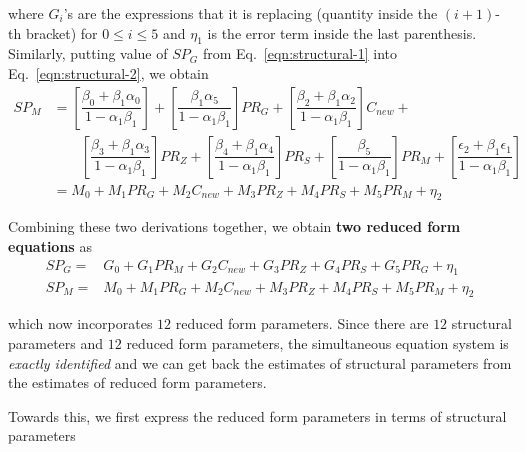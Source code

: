 \documentclass[11pt, a4paper]{article}
\begin{document}
\noindent where $G_i$'s are the expressions that it is replacing (quantity inside the $(i+1)$-th bracket) for $0 \leq i \leq 5$ and $\eta_{1}$ is the error term inside the last parenthesis. Similarly, putting value of $SP_G$ from Eq.~\eqref{eqn:structural-1} into Eq.~\eqref{eqn:structural-2}, we obtain
%
\begin{align*}
    SP_{M} & =  \left[\dfrac{\beta_{0}+\beta_{1}\alpha_{0}}{1-\alpha_{1}\beta_{1}}\right]+\left[\dfrac{\beta_{1}\alpha_{5}}{1-\alpha_{1}\beta_{1}}\right]PR_{G}+\left[\dfrac{\beta_{2}+\beta_{1}\alpha_{2}}{1-\alpha_{1}\beta_{1}}\right]C_{new}+\\
    & \qquad  \left[\dfrac{\beta_{3}+\beta_{1}\alpha_{3}}{1-\alpha_{1}\beta_{1}}\right]PR_{Z}+ \left[\dfrac{\beta_{4}+\beta_{1}\alpha_{4}}{1-\alpha_{1}\beta_{1}}\right]PR_{S}  +\left[\dfrac{\beta_{5}}{1-\alpha_{1}\beta_{1}}\right]PR_{M}+\left[\dfrac{\epsilon_{2}+\beta_{1}\epsilon_{1}}{1-\alpha_{1}\beta_{1}}\right] \\
     & = M_{0}+M_{1}PR_{G}+M_{2}C_{new}+M_{3}PR_{Z}+M_{4}PR_{S}+M_{5}PR_{M}+\eta_{2}
\end{align*}

Combining these two derivations together, we obtain \textbf{two reduced form equations} as
%
\begin{align}
    SP_{G} = & G_{0}+G_{1}PR_{M}+G_{2}C_{new}+G_{3}PR_{Z}+G_{4}PR_{S}+G_{5}PR_{G}+\eta_{1} \label{eqn:reduced-1}\\
    SP_{M} = & M_{0}+M_{1}PR_{G}+M_{2}C_{new}+M_{3}PR_{Z}+M_{4}PR_{S}+M_{5}PR_{M}+\eta_{2} \label{eqn:reduced-2}
\end{align}

\noindent which now incorporates $12$ reduced form parameters. Since there are $12$ structural parameters and $12$ reduced form parameters, the simultaneous equation system is \textit{exactly identified} and we can get back the estimates of structural parameters from the estimates of reduced form parameters. 

Towards this, we first express the reduced form parameters in terms of structural parameters
\end{document}
